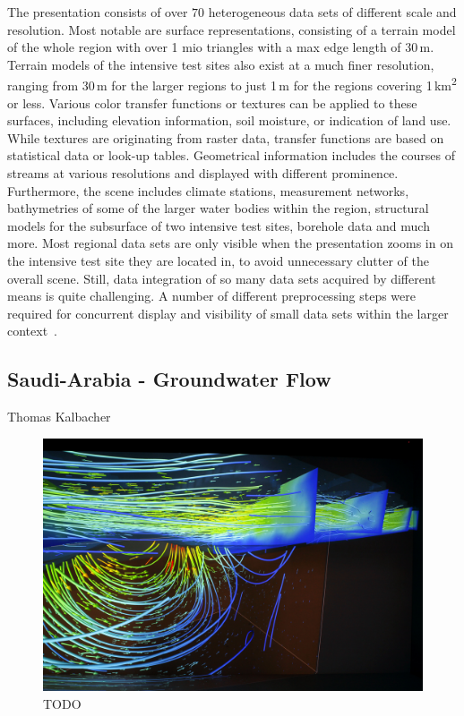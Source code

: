\documentclass[twocolumn]{svjour3}          %
\begin{document}
The presentation consists of over $70$ heterogeneous data sets of different scale and resolution. Most notable are surface representations, consisting of a terrain model of the whole region with over 1 mio triangles with a max edge length of 30\,m. Terrain models of the intensive test sites also exist at a much finer resolution, ranging from 30\,m for the larger regions to just 1\,m for the regions covering 1\,km\textsuperscript{2} or less. Various color transfer functions or textures can be applied to these surfaces, including elevation information, soil moisture, or indication of land use. While textures are originating from raster data, transfer functions are based on statistical data or look-up tables. Geometrical information includes the courses of streams at various resolutions and displayed with different prominence. Furthermore, the scene includes climate stations, measurement networks, bathymetries of some of the larger water bodies within the region, structural models for the subsurface of two intensive test sites, borehole data and much more. Most regional data sets are only visible when the presentation zooms in on the intensive test site they are located in, to avoid unnecessary clutter of the overall scene. Still, data integration of so many data sets acquired by different means is quite challenging. A number of different preprocessing steps were required for concurrent display and visibility of small data sets within the larger context~\cite{rink:wessti, rink:eesenvirvis}.

\subsection{Saudi-Arabia - Groundwater
Flow}\label{saudi-arabia---groundwater-flow}

Thomas Kalbacher \cite{zehner:modelcare, rink:iwas}


\begin{figure}
  \includegraphics[width=\linewidth]{images/streambed.jpg}
\caption{TODO}
\label{fig:streambed}
\end{figure}
\end{document}
